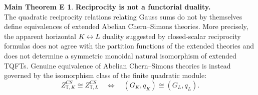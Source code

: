 \documentclass[12pt]{amsart}
\numberwithin{equation}{section}
\theoremstyle{definition}
\newtheorem*{theoremE}{Main Theorem E}
\begin{document}
\begin{theoremE}
\textbf{Reciprocity is not a functorial duality.}
\leavevmode\\

The quadratic reciprocity relations relating Gauss sums do not by themselves define equivalences of extended Abelian Chern--Simons theories. More precisely, the apparent horizontal $K\leftrightarrow L$ duality suggested by closed-scalar reciprocity formulas does not agree with the partition functions of the extended theories and does not determine a symmetric monoidal natural isomorphism of extended TQFTs. Genuine equivalence of Abelian Chern--Simons theories is instead governed by the isomorphism class of the finite quadratic module:
$$
Z^{CS}_{\mathbb T,K}\cong Z^{CS}_{\mathbb T,L}
\quad\Longleftrightarrow\quad
(G_K,q_K)\cong (G_L,q_L).
$$
\end{theoremE}
\end{document}
